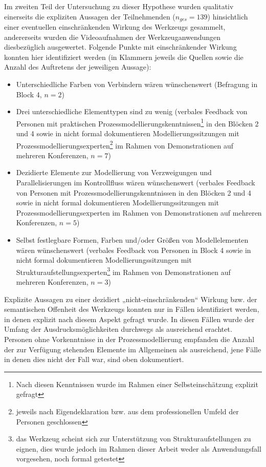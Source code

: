 Im zweiten Teil der Untersuchung zu dieser Hypothese wurden qualitativ einerseits die expliziten Aussagen der Teilnehmenden ($n_{ges}=139$) hinsichtlich einer eventuellen einschränkenden Wirkung des Werkzeugs gesammelt, andererseits wurden die Videoaufnahmen der Werkzeuganwendungen diesbezüglich ausgewertet. Folgende Punkte mit einschränkender Wirkung konnten hier identifiziert werden (in Klammern jeweils die Quellen sowie die Anzahl des Auftretens der jeweiligen Aussage):
\begin{itemize}
	\item Unterschiedliche Farben von Verbindern wären wünschenswert (Befragung in Block 4, $n=2$)
	\item Drei unterschiedliche Elementtypen sind zu wenig (verbales Feedback von Personen mit praktischen Prozessmodellierungskenntnissen\footnote{Nach diesen Kenntnissen wurde im Rahmen einer Selbsteinschätzung explizit gefragt} in den Blöcken 2 und 4 sowie in nicht formal dokumentieren Modellierungssitzungen mit Prozessmodellierungsexperten\footnote{jeweils nach Eigendeklaration bzw. aus dem professionellen Umfeld der Personen geschlossen} im Rahmen von Demonstrationen auf mehreren Konferenzen, $n=7$)
	\item Dezidierte Elemente zur Modellierung von Verzweigungen und Parallelisierungen im Kontrollfluss wären wünschenswert (verbales Feedback von Personen mit Prozessmodellierungskenntnissen in den Blöcken 2 und 4 sowie in nicht formal dokumentieren Modellierungssitzungen mit Prozessmodellierungsexperten im Rahmen von Demonstrationen auf mehreren Konferenzen, $n=5$)
	\item Selbst festlegbare Formen, Farben und/oder Größen von Modellelementen wären wünschenswert (verbales Feedback von Personen in Block 4 sowie in nicht formal dokumentieren Modellierungssitzungen mit  Strukturaufstellungsexperten\footnote{das Werkzeug scheint sich zur Unterstützung von Strukturaufstellungen \citep{Sparrer02} zu eignen, dies wurde jedoch im Rahmen dieser Arbeit weder als Anwendungsfall vorgesehen, noch formal getestet} im Rahmen von Demonstrationen auf mehreren Konferenzen, $n=3$)
\end{itemize}

Explizite Aussagen zu einer dezidiert „nicht-einschränkenden“ Wirkung bzw. der semantischen Offenheit des Werkzeugs konnten nur in Fällen identifiziert werden, in denen explizit nach diesem Aspekt gefragt wurde. In diesen Fällen wurde der Umfang der Ausdrucksmöglichkeiten durchwegs als ausreichend erachtet. Personen ohne Vorkenntnisse in der Prozessmodellierung empfanden die Anzahl der zur Verfügung stehenden Elemente im Allgemeinen als ausreichend, jene Fälle in denen dies nicht der Fall war, sind oben dokumentiert.

